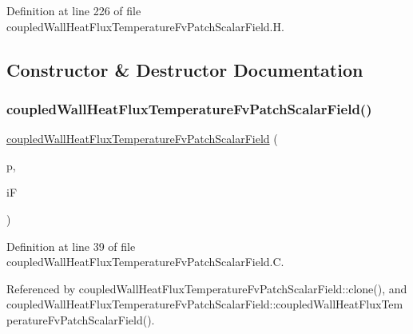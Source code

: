 Definition at line 226 of file coupled\+Wall\+Heat\+Flux\+Temperature\+Fv\+Patch\+Scalar\+Field.\+H.



\subsection{Constructor \& Destructor Documentation}
\mbox{\label{classFoam_1_1coupledWallHeatFluxTemperatureFvPatchScalarField_ad4d00982c27a750370f43a0189d5f3a9}} 
\subsubsection{\texorpdfstring{coupled\+Wall\+Heat\+Flux\+Temperature\+Fv\+Patch\+Scalar\+Field()}{coupledWallHeatFluxTemperatureFvPatchScalarField()}\hspace{0.1cm}{\footnotesize\ttfamily [1/5]}}
{\footnotesize\ttfamily \hyperlink{classFoam_1_1coupledWallHeatFluxTemperatureFvPatchScalarField}{coupled\+Wall\+Heat\+Flux\+Temperature\+Fv\+Patch\+Scalar\+Field} (\begin{DoxyParamCaption}\item[{const fv\+Patch \&}]{p,  }\item[{const Dimensioned\+Field$<$ scalar, vol\+Mesh $>$ \&}]{iF }\end{DoxyParamCaption})}



Definition at line 39 of file coupled\+Wall\+Heat\+Flux\+Temperature\+Fv\+Patch\+Scalar\+Field.\+C.



Referenced by coupled\+Wall\+Heat\+Flux\+Temperature\+Fv\+Patch\+Scalar\+Field\+::clone(), and coupled\+Wall\+Heat\+Flux\+Temperature\+Fv\+Patch\+Scalar\+Field\+::coupled\+Wall\+Heat\+Flux\+Temperature\+Fv\+Patch\+Scalar\+Field().

